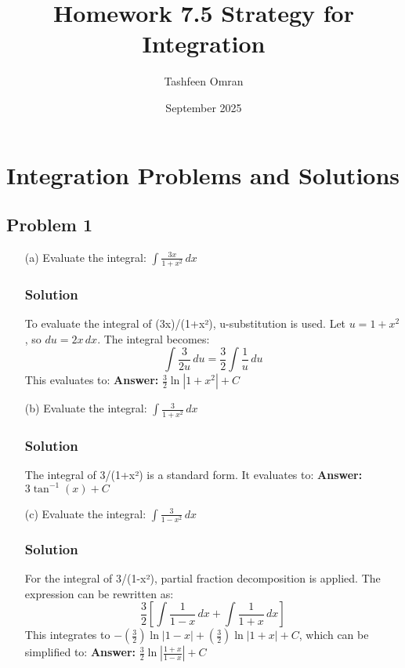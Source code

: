 \documentclass{article}
\title{Homework 7.5 Strategy for Integration}
\author{Tashfeen Omran}
\date{September 2025}
\begin{document}
\maketitle

\section{Integration Problems and Solutions}

\subsection{Problem 1}
\begin{enumerate}
    \item[(a)] Evaluate the integral: $ \int \frac{3x}{1+x^2} \,dx $
    \subsubsection*{Solution}
    To evaluate the integral of (3x)/(1+x²), u-substitution is used.
    Let $ u = 1+x^2 $, so $ du = 2x \,dx $.
    The integral becomes:
    \[ \int \frac{3}{2u} \,du = \frac{3}{2} \int \frac{1}{u} \,du \]
    This evaluates to:
    \textbf{Answer:} $ \frac{3}{2}\ln|1+x^2| + C $

    \item[(b)] Evaluate the integral: $ \int \frac{3}{1+x^2} \,dx $
    \subsubsection*{Solution}
    The integral of 3/(1+x²) is a standard form.
    It evaluates to:
    \textbf{Answer:} $ 3\tan^{-1}(x) + C $

    \item[(c)] Evaluate the integral: $ \int \frac{3}{1-x^2} \,dx $
    \subsubsection*{Solution}
    For the integral of 3/(1-x²), partial fraction decomposition is applied. The expression can be rewritten as:
    \[ \frac{3}{2} \left[ \int \frac{1}{1-x} \,dx + \int \frac{1}{1+x} \,dx \right] \]
    This integrates to $ -(\frac{3}{2})\ln|1-x| + (\frac{3}{2})\ln|1+x| + C $, which can be simplified to:
    \textbf{Answer:} $ \frac{3}{2}\ln\left|\frac{1+x}{1-x}\right| + C $
\end{enumerate}
\end{document}
